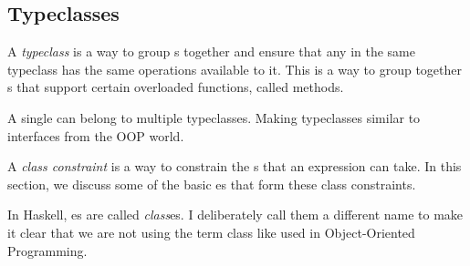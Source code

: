 \subsection{Typeclasses}\label{subsec:Typeclasses}
\begin{definition}[Typeclass]\label{def:Typeclass}
  A \emph{typeclass} is a way to group s together and ensure that any  in the same typeclass has the same operations available to it.
  This is a way to group together s that support certain overloaded functions, called methods.

  A single  can belong to multiple typeclasses.
  Making typeclasses similar to interfaces from the OOP world.

  \begin{remark}\label{rmk:Class_Constraint}
    A \emph{class constraint} is a way to constrain the s that an expression can take.
    In this section, we discuss some of the basic es that form these class constraints.
  \end{remark}

  \begin{remark}\label{rmk:Class_vs_Typeclass}
    In Haskell, es are called \emph{class}es.
    I deliberately call them a different name to make it clear that we are not using the term class like used in Object-Oriented Programming.
  \end{remark}
\end{definition}

\subsubsection{\texorpdfstring{}{\texttt{Eq}}}\label{subsubsec:Eq_Typeclass}

\subsubsection{\texorpdfstring{}{\texttt{Ord}}}\label{subsubsec:Ord_Typeclass}
\subsubsection{\texorpdfstring{}{\texttt{Show}}}\label{subsubsec:Show_Typeclass}
\subsubsection{\texorpdfstring{}{\texttt{Read}}}\label{subsubsec:Read_Typeclass}
